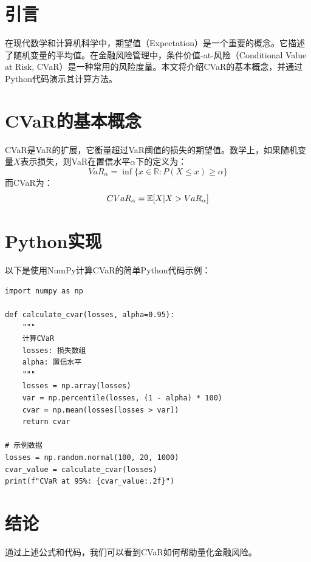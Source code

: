 \documentclass{article}
\begin{document}
\maketitle

\section{引言}

在现代数学和计算机科学中，期望值（Expectation）是一个重要的概念。它描述了随机变量的平均值。在金融风险管理中，条件价值-at-风险（Conditional Value at Risk, CVaR）是一种常用的风险度量。本文将介绍CVaR的基本概念，并通过Python代码演示其计算方法。

\section{CVaR的基本概念}

CVaR是VaR的扩展，它衡量超过VaR阈值的损失的期望值。数学上，如果随机变量\(X\)表示损失，则VaR在置信水平\(\alpha\)下的定义为：
\[
VaR_\alpha = \inf \{ x \in \mathbb{R} : P(X \leq x) \geq \alpha \}
\]
而CVaR为：
\[
CVaR_\alpha = \mathbb{E}[ X | X > VaR_\alpha ]
\]

\section{Python实现}

以下是使用NumPy计算CVaR的简单Python代码示例：

\begin{lstlisting}[caption=CVaR计算示例,label=lst:cvar-demo]
import numpy as np

def calculate_cvar(losses, alpha=0.95):
    """
    计算CVaR
    losses: 损失数组
    alpha: 置信水平
    """
    losses = np.array(losses)
    var = np.percentile(losses, (1 - alpha) * 100)
    cvar = np.mean(losses[losses > var])
    return cvar

# 示例数据
losses = np.random.normal(100, 20, 1000)
cvar_value = calculate_cvar(losses)
print(f"CVaR at 95%: {cvar_value:.2f}")
\end{lstlisting}

\section{结论}

通过上述公式和代码，我们可以看到CVaR如何帮助量化金融风险。
\end{document}
